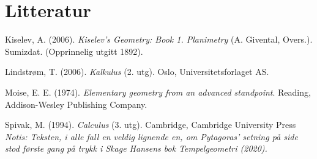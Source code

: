 



\chapter*{Litteratur}
Kiselev, A. (2006). \textit{Kiselev's Geometry: Book 1. Planimetry} (A. Givental, Overs.). Sumizdat. (Opprinnelig utgitt 1892).\vsk

Lindstrøm, T. (2006). \textit{Kalkulus} (2. utg). Oslo, Universitetsforlaget AS.\vsk

Moise, E. E. (1974). \textit{Elementary geometry from an advanced standpoint}. Reading, Addison-Wesley Publishing Company.\vsk

Spivak, M. (1994). \textit{Calculus} (3. utg). Cambridge, Cambridge University Press
\vfill
\textit{\footnotesize Notis: Teksten, i alle fall en veldig lignende en, om Pytagoras' setning på side \pageref{pytforklaringintro} stod første gang på trykk i Skage Hansens bok \textit{Tempelgeometri} (2020).}
\newpage
